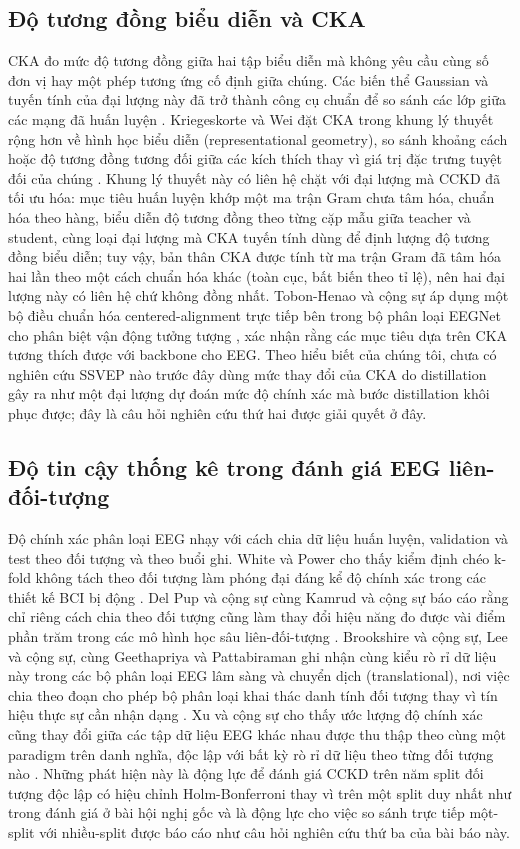 \documentclass[11pt,a4paper,twoside,asymmetric]{article}
\begin{document}
\subsection{Độ tương đồng biểu diễn và CKA}
CKA đo mức độ tương đồng giữa hai tập biểu diễn mà không yêu cầu cùng số đơn vị hay một phép tương ứng cố định giữa chúng. Các biến thể Gaussian và tuyến tính của đại lượng này đã trở thành công cụ chuẩn để so sánh các lớp giữa các mạng đã huấn luyện \cite{R73,R74,R71}. Kriegeskorte và Wei đặt CKA trong khung lý thuyết rộng hơn về hình học biểu diễn (representational geometry), so sánh khoảng cách hoặc độ tương đồng tương đối giữa các kích thích thay vì giá trị đặc trưng tuyệt đối của chúng \cite{R72}. Khung lý thuyết này có liên hệ chặt với đại lượng mà CCKD đã tối ưu hóa: mục tiêu huấn luyện khớp một ma trận Gram chưa tâm hóa, chuẩn hóa theo hàng, biểu diễn độ tương đồng theo từng cặp mẫu giữa teacher và student, cùng loại đại lượng mà CKA tuyến tính dùng để định lượng độ tương đồng biểu diễn; tuy vậy, bản thân CKA được tính từ ma trận Gram đã tâm hóa hai lần theo một cách chuẩn hóa khác (toàn cục, bất biến theo tỉ lệ), nên hai đại lượng này có liên hệ chứ không đồng nhất. Tobon-Henao và cộng sự áp dụng một bộ điều chuẩn hóa centered-alignment trực tiếp bên trong bộ phân loại EEGNet cho phân biệt vận động tưởng tượng \cite{R70}, xác nhận rằng các mục tiêu dựa trên CKA tương thích được với backbone cho EEG. Theo hiểu biết của chúng tôi, chưa có nghiên cứu SSVEP nào trước đây dùng mức thay đổi của CKA do distillation gây ra như một đại lượng dự đoán mức độ chính xác mà bước distillation khôi phục được; đây là câu hỏi nghiên cứu thứ hai được giải quyết ở đây.

\subsection{Độ tin cậy thống kê trong đánh giá EEG liên-đối-tượng}
Độ chính xác phân loại EEG nhạy với cách chia dữ liệu huấn luyện, validation và test theo đối tượng và theo buổi ghi. White và Power cho thấy kiểm định chéo k-fold không tách theo đối tượng làm phóng đại đáng kể độ chính xác trong các thiết kế BCI bị động \cite{R75}. Del Pup và cộng sự cùng Kamrud và cộng sự báo cáo rằng chỉ riêng cách chia theo đối tượng cũng làm thay đổi hiệu năng đo được vài điểm phần trăm trong các mô hình học sâu liên-đối-tượng \cite{R76,R79}. Brookshire và cộng sự, Lee và cộng sự, cùng Geethapriya và Pattabiraman ghi nhận cùng kiểu rò rỉ dữ liệu này trong các bộ phân loại EEG lâm sàng và chuyển dịch (translational), nơi việc chia theo đoạn cho phép bộ phân loại khai thác danh tính đối tượng thay vì tín hiệu thực sự cần nhận dạng \cite{R77,R78,R81}. Xu và cộng sự cho thấy ước lượng độ chính xác cũng thay đổi giữa các tập dữ liệu EEG khác nhau được thu thập theo cùng một paradigm trên danh nghĩa, độc lập với bất kỳ rò rỉ dữ liệu theo từng đối tượng nào \cite{R80}. Những phát hiện này là động lực để đánh giá CCKD trên năm split đối tượng độc lập có hiệu chỉnh Holm-Bonferroni thay vì trên một split duy nhất như trong đánh giá ở bài hội nghị gốc và là động lực cho việc so sánh trực tiếp một-split với nhiều-split được báo cáo như câu hỏi nghiên cứu thứ ba của bài báo này.
\end{document}
